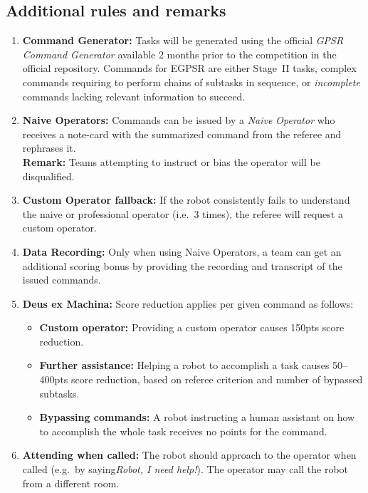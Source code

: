 %
%
\subsection*{Additional rules and remarks}
\begin{enumerate}[nosep]
	\item \textbf{Command Generator:} Tasks will be generated using the official \emph{GPSR Command Generator} available 2 months prior to the competition in the official repository. Commands for EGPSR are either Stage~II tasks, complex commands requiring to perform chains of subtasks in sequence, or \emph{incomplete} commands lacking relevant information to succeed.

	\item \textbf{Naive Operators:} Commands can be issued by a \emph{Naive Operator} who receives a note-card with the summarized command from the referee and rephrases it.\\[0pt]
	\textbf{Remark:} Teams attempting to instruct or bias the operator will be disqualified.

	\item \textbf{Custom Operator fallback:} If the robot consistently fails to understand the naive or professional operator (i.e.~3 times), the referee will request a custom operator.

	\item \textbf{Data Recording:} Only when using Naive Operators, a team can get an additional scoring bonus by providing the recording and transcript of the issued commands.

	\item \textbf{Deus ex Machina:} Score reduction applies per given command as follows:
	\begin{itemize}[nosep]
	\item \textbf{Custom operator:} Providing a custom operator causes 150pts score reduction.
	\item \textbf{Further assistance:} Helping a robot to accomplish a task causes 50--400pts score reduction, based on referee criterion and number of bypassed subtasks.
	\item \textbf{Bypassing commands:} A robot instructing a human assistant on how to accomplish the whole task receives no points for the command.
	\end{itemize}

	\item \textbf{Attending when called:} The robot should approach to the operator when called (e.g.~by saying\textit {Robot, I need help!}). The operator may call the robot from a different room.


\end{enumerate}
